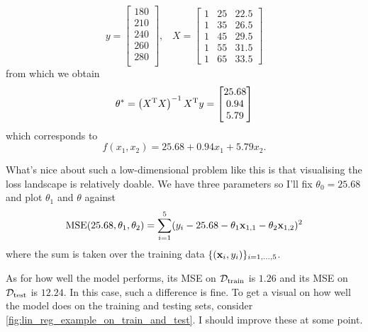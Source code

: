 \documentclass[11pt]{article}
\begin{document}
$$
y=
\begin{bmatrix}
    180\\
    210\\
    240\\
    260\\
    280\\
\end{bmatrix},
\hspace{10pt}
X=
\begin{bmatrix}
    1 & 25 & 22.5 \\
    1 & 35 & 26.5 \\
    1 & 45 & 29.5 \\
    1 & 55 & 31.5 \\
    1 & 65 & 33.5
\end{bmatrix}
$$
from which we obtain
$$
\theta^{*}
=
\left(X^{\text{T}}X\right)^{-1}X^{\text{T}}y
=
\begin{bmatrix}
    25.68\\
    0.94\\
    5.79
\end{bmatrix}
$$
which corresponds to
$$
f(x_1,x_2)=25.68+0.94x_1+5.79x_2.
$$

What's nice about such a low-dimensional problem like this is that visualising the loss landscape is relatively doable. We have three parameters so I'll fix $\theta_0=25.68$ and plot $\theta_1$ and $\theta$ against 
$$
\text{MSE}(25.68, \theta_1, \theta_2)
=
\sum_{i=1}^5 (y_i-25.68-\theta_1\mathbf{x}_{1,1}-\theta_2\mathbf{x}_{1,2})^2
$$
where the sum is taken over the training data $\{(\mathbf{x}_i,y_i)\}_{i=1,\dots,5}$.

As for how well the model performs, its MSE on $\mathcal{D}_{\text{train}}$ is $1.26$ and its MSE on $\mathcal{D}_{\text{test}}$ is $12.24$. In this case, such a difference is fine. To get a visual on how well the model does on the training and testing sets, consider \autoref{fig:lin_reg_example_on_train_and_test}. I should improve these at some point.
\end{document}
